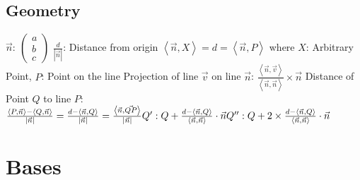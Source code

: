 \documentclass[12pt]{article}
\begin{document}
\subsection{Geometry}
\begin{math}
\vec{n}:\ \left ( \begin{matrix} a\\ b\\ c\end{matrix} \right )
\end{math}\newline\newline\newline
\begin{math}\frac{d}{\left |\vec{n}  \right |}\end{math}: Distance from origin\newline\newline
\begin{math}\left \langle \vec{n},X \right \rangle = d = \left \langle \vec{n},P \right \rangle\end{math} where $X$: Arbitrary Point, $P$: Point on the line\newline\newline
Projection of line $\vec{v}$ on line $\vec{n}$: \begin{math}\frac{\left \langle \vec{n}, \vec{v} \right \rangle}{\left \langle \vec{n},\vec{n} \right \rangle}\times \vec{n}\end{math}\newline\newline
Distance of Point $Q$ to line $P$:\newline
\begin{math}
\frac{\left \langle P,\vec{n} \right \rangle - \left \langle Q,\vec{n} \right \rangle}{\left | \vec{n} \right |}=\frac{d-\left \langle \vec{n}, Q \right \rangle}{\left | \vec{n} \right |}=
\frac{\left \langle \vec{n}, \vec{QP} \right \rangle}{\left | \vec{n} \right |}\newline\newline
Q':Q+\frac{d-\left \langle \vec{n},Q \right \rangle}{\left \langle \vec{n},\vec{n} \right \rangle}\cdot \vec{n}\newline\newline
Q'': Q+2\times\frac{d-\left \langle \vec{n},Q \right \rangle}{\left \langle \vec{n},\vec{n} \right \rangle}\cdot \vec{n}
\end{math}\newpage
\section{Bases}
\end{document}
